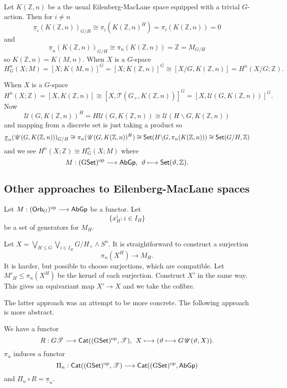 \documentclass[11pt]{article}
\begin{document}
\begin{FirstNineLectures}
\begin{exmp*}
Let $K(\mathbb{Z},n)$ be a the usual Eilenberg-MacLane space equipped with a trivial $G$-action. Then for $i\neq n$
\[\underline{\pi}_i(K(\mathbb{Z},n))_{G/H}\cong
\pi_i(K(\mathbb{Z},n)^H)=\pi_i(K(\mathbb{Z},n))=0\]
and
\[\underline{\pi}_n(K(\mathbb{Z},n))_{G/H}\cong
\pi_n(K(\mathbb{Z},n))=\mathbb{Z}=M_{G/H}\]
so $K(\mathbb{Z},n)=K(M,n)$. When $X$ is a $G$-space
\[H^n_G(X;M)=[X;K(M,n)]^G=[X;K(\mathbb{Z},n)]^G
\cong[X/G,K(\mathbb{Z},n)]=H^n(X/G;\mathbb{Z}).\]
\end{exmp*}
\begin{exmp*}
When $X$ is a $G$-space
\[H^n(X;\mathbb{Z})=[X,K(\mathbb{Z},n)]
\cong[X,\mathscr{T}(G_+,K(\mathbb{Z},n))]^G=
[X,\mathscr{U}(G,K(\mathbb{Z},n))]^G.\]
Now
\[\mathscr{U}(G,K(\mathbb{Z},n))^H=H\mathscr{U}(G,K(\mathbb{Z},n))
\cong\mathscr{U}(H\backslash G,K(\mathbb{Z},n))\]
and mapping from a discrete set is just taking a product so
\[\underline{\pi}_n(\mathscr{U}(G,K(\mathbb{Z},n)))_{G/H}\cong
\pi_n(\mathscr{U}(G,K(\mathbb{Z},n))^H)\cong
\operatorname{{\mathsf{Set}}}(H\backslash G,\pi_n(K(\mathbb{Z},n)))\cong\operatorname{{\mathsf{Set}}}(G/H,\mathbb{Z})\]
and we see $H^n(X;\mathbb{Z})\cong H^n_G(X;M)$ where
\[M:(\operatorname{{G\mathsf{Set}}})^{\textup{op}}\longrightarrow\operatorname{{\mathsf{AbGp}}},
\hspace{4pt}
\vartheta\longmapsto\operatorname{{\mathsf{Set}}}(\vartheta,\mathbb{Z}).\]
\end{exmp*}






\subsection*{Other approaches to Eilenberg-MacLane spaces}
Let $M:(\operatorname{{\mathsf{Orb}}}_G)^{\textup{op}}\longrightarrow\operatorname{{\mathsf{AbGp}}}$ be a functor. Let
\[\{x^i_H:i\in I_H\}\]
be a set of generators for $M_H$.

Let $X=\bigvee_{H\leq G}\bigvee_{i\in I_H}G/H_+\wedge S^n$. It is straightforward to construct a surjection
\[\pi_n(X^H)\to M_H.\]
It is harder, but possible to choose surjections, which are compatible. Let $M'_H\leq\pi_n(X^H)$ be the kernel of each surjection. Construct $X'$ in the same way. This gives an equivariant map $X'\to X$ and we take the cofibre.

The latter approach was an attempt to be more concrete. The following approach is more abstract.

We have a functor
\[R:G\mathscr{T}\longrightarrow\operatorname{{\mathsf{Cat}}}
((\operatorname{{G\mathsf{Set}}})^{\textup{op}},\mathscr{T}),
\hspace{4pt}
X\longmapsto(\vartheta\longmapsto G\mathscr{U}(\vartheta,X)).\]
$\pi_n$ induces a functor
\[\Pi_n:\operatorname{{\mathsf{Cat}}}
((\operatorname{{G\mathsf{Set}}})^{\textup{op}},\mathscr{T})\longrightarrow
\operatorname{{\mathsf{Cat}}}
((\operatorname{{G\mathsf{Set}}})^{\textup{op}},\operatorname{{\mathsf{AbGp}}})\]
and $\Pi_n\circ R=\underline{\pi}_n$.


\end{FirstNineLectures}
\end{document}
